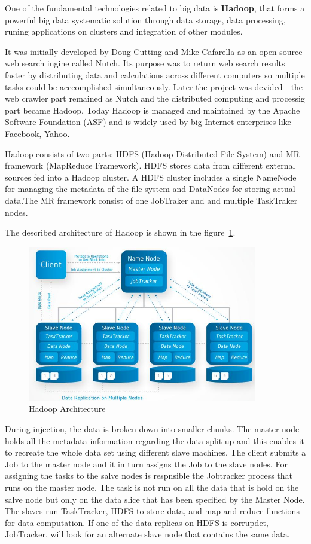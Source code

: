 One of the fundamental technologies related to big data is \textbf{Hadoop}, that forms a powerful big data systematic solution through data storage, data processing, runing applications on clusters and integration of other modules. 

It was initially developed by Doug Cutting and Mike Cafarella as an open-source web search ingine called Nutch. Its purpose was to return web search results faster by distributing data and calculations across different computers so multiple tasks could be acccomplished simultaneously. Later the project was devided - the web crawler part remained as Nutch and the distributed computing and processig part became Hadoop.\cite{sas} Today Hadoop is managed and maintained by the Apache Software Foundation (ASF) and is widely used by big Internet enterprises like Facebook, Yahoo. 

Hadoop consists of two parts: HDFS (Hadoop Distributed File System) and MR framework (MapReduce Framework). HDFS stores data from different external sources fed into a Hadoop cluster. A HDFS cluster includes a single NameNode for managing the metadata of the file system and DataNodes for storing actual data.The MR framework consist of one JobTraker and and multiple TaskTraker nodes.

The described architecture of Hadoop is shown in the \mbox{figure \ref{hdfs_arch}}.

\begin{figure}[!ht]
\centering
\includegraphics[width=10cm]{hdfs_architecture}
\caption{Hadoop Architecture\cite{hdfsFigure}}\label{hdfs_arch}
\end{figure}

During injection, the data is broken down into smaller chunks. The master node holds all the metadata information regarding the data split up and this enables it to recreate the whole data set using different slave machines.\cite{blog} The client submits a Job to the master node and it in turn assigns the Job to the slave nodes. For assigning the tasks to the salve nodes is respnsible the Jobtracker process that runs on the master node. The task is not run on all the data that is hold on the salve node but only on the data slice that has been specified by the Master Node. The slaves run TaskTracker, HDFS to store data, and map and reduce functions for data computation.\cite{rosebt} If one of the data replicas on HDFS is corrupdet, JobTracker, will look for an alternate slave node that contains the same data. 

